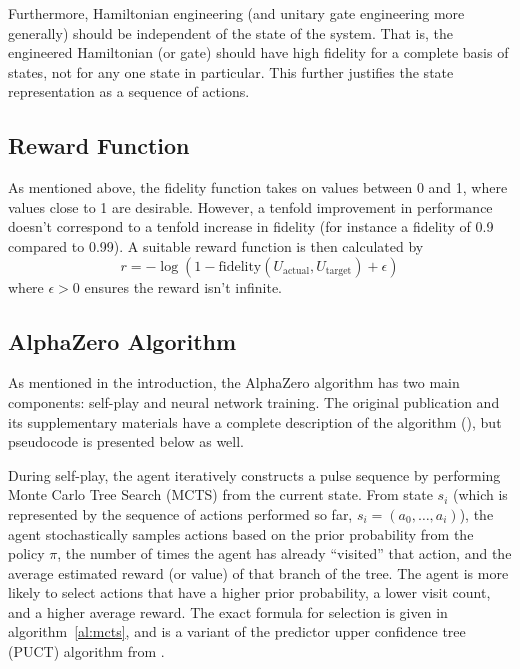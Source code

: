 Furthermore, Hamiltonian engineering (and unitary gate engineering more generally) should be independent of the state of the system. That is, the engineered Hamiltonian (or gate) should have high fidelity for a complete basis of states, not for any one state in particular. This further justifies the state representation as a sequence of actions.

\subsection{Reward Function}

As mentioned above, the fidelity function takes on values between 0 and 1, where values close to 1 are desirable.
However, a tenfold improvement in performance doesn't correspond to a tenfold increase in fidelity (for instance a fidelity of 0.9 compared to 0.99). A suitable reward function is then calculated by
\begin{equation}
    r = -\log(1-\text{fidelity}(U_\text{actual}, U_\text{target}) + \epsilon)
\end{equation}
where $\epsilon>0$ ensures the reward isn't infinite.

\subsection{AlphaZero Algorithm}

As mentioned in the introduction, the AlphaZero algorithm has two main components: self-play and neural network training. The original publication and its supplementary materials have a complete description of the algorithm (\cite{Silver1140}), but pseudocode is presented below as well.

During self-play, the agent iteratively constructs a pulse sequence by performing Monte Carlo Tree Search (MCTS) from the current state. From state $s_i$ (which is represented by the sequence of actions performed so far, $s_i = (a_0, \dots, a_i)$), the agent stochastically samples actions based on the prior probability from the policy $\pi$, the number of times the agent has already ``visited'' that action, and the average estimated reward (or value) of that branch of the tree. The agent is more likely to select actions that have a higher prior probability, a lower visit count, and a higher average reward. The exact formula for selection is given in algorithm~\ref{al:mcts},
and is a variant of the predictor upper confidence tree (PUCT) algorithm from \cite{Rosin:2011uu}.

